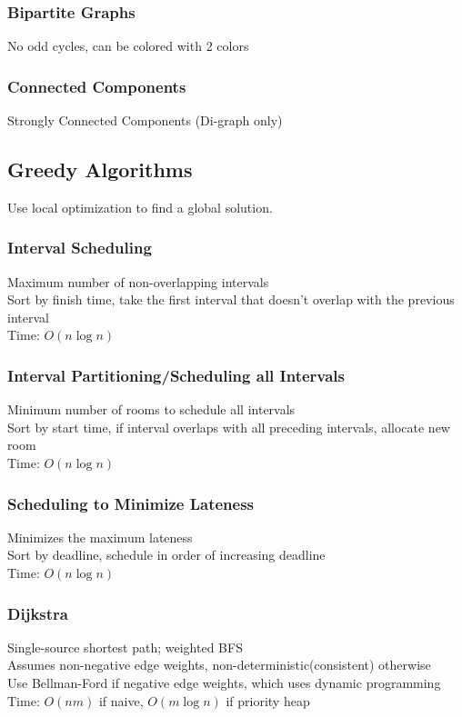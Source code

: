 \documentclass{article}
\begin{document}
\begin{multicols*}{2}
        \subsubsection*{Bipartite Graphs}
        No odd cycles, can be colored with 2 colors
        \subsubsection*{Connected Components}
        Strongly Connected Components (Di-graph only)
        \subsection*{Greedy Algorithms}
        Use local optimization to find a global solution.
        \subsubsection*{Interval Scheduling}
        Maximum number of non-overlapping intervals\\
        Sort by finish time, take the first interval that doesn't overlap
        with the previous interval\\
        Time: $O(n\log n)$
        \subsubsection*{Interval Partitioning/Scheduling all Intervals}
        Minimum number of rooms to schedule all intervals\\
        Sort by start time, if interval overlaps with all preceding intervals, allocate new room\\
        Time: $O(n\log n)$
        \subsubsection*{Scheduling to Minimize Lateness}
        Minimizes the maximum lateness\\
        Sort by deadline, schedule in order of increasing deadline\\
        Time: $O(n\log n)$
        \subsubsection*{Dijkstra}
        Single-source shortest path; weighted BFS\\
        Assumes non-negative edge weights, non-deterministic(consistent) otherwise\\
        Use Bellman-Ford if negative edge weights, which uses dynamic programming\\
        Time: $O(nm)$ if naive, $O(m\log n)$ if priority heap

\end{multicols*}
\end{document}
